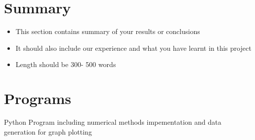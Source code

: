 \documentclass[12pt]{article}
\begin{document}
\section{Summary}
\label{sec:summary}
\begin{itemize}
    \item This section contains summary of your results or conclusions
    \item It should also include our experience and what you have learnt in this project
    \item Length should be 300- 500 words 
\end{itemize}


\newpage 
\appendix
\section{Programs}
Python Program including numerical methods impementation and data generation for graph plotting
\end{document}
